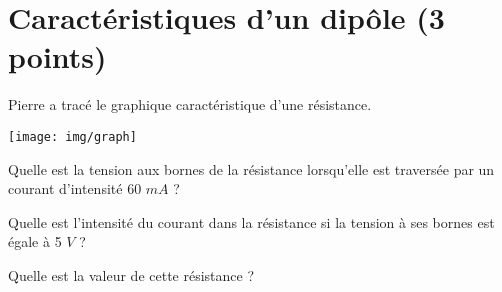 \section{Caractéristiques d'un dipôle (3 points)}

Pierre a tracé le graphique caractéristique d'une résistance.

\begin{center}
	\texttt{[image: img/graph]}
\end{center}

\begin{questions}
	\question[1] Quelle est la tension aux bornes de la résistance lorsqu'elle est traversée par un courant d'intensité 60 $mA$ ?
	
	\question[1] Quelle est l'intensité du courant  dans la résistance si la tension à ses bornes est égale à 5 $V$ ?
	
	\question[1] Quelle est la valeur de cette résistance ?
\end{questions}